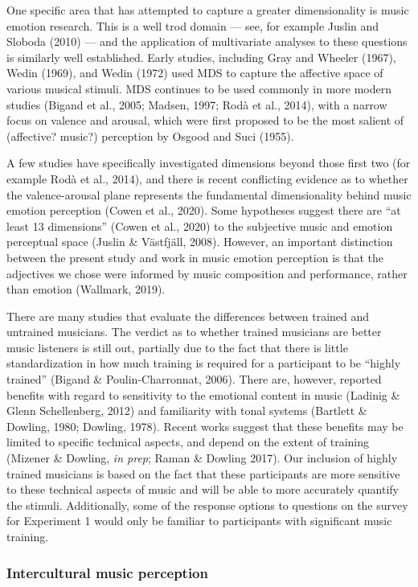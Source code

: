 \documentclass[
  english,
  man,floatsintext]{apa6}
\begin{document}
One specific area that has attempted to capture a greater dimensionality is music emotion research. This is a well trod domain --- see, for example Juslin and Sloboda (2010) --- and the application of multivariate analyses to these questions is similarly well established. Early studies, including Gray and Wheeler (1967), Wedin (1969), and Wedin (1972) used MDS to capture the affective space of various musical stimuli. MDS continues to be used commonly in more modern studies (Bigand et al., 2005; Madsen, 1997; Rodà et al., 2014), with a narrow focus on valence and arousal, which were first proposed to be the most salient of (affective? music?) perception by Osgood and Suci (1955).

A few studies have specifically investigated dimensions beyond those first two (for example Rodà et al., 2014), and there is recent conflicting evidence as to whether the valence-arousal plane represents the fundamental dimensionality behind music emotion perception (Cowen et al., 2020). Some hypotheses suggest there are ``at least 13 dimensions'' (Cowen et al., 2020) to the subjective music and emotion perceptual space (Juslin \& Västfjäll, 2008). However, an important distinction between the present study and work in music emotion perception is that the adjectives we chose were informed by music composition and performance, rather than emotion (Wallmark, 2019).

There are many studies that evaluate the differences between trained and untrained musicians. The verdict as to whether trained musicians are better music listeners is still out, partially due to the fact that there is little standardization in how much training is required for a participant to be ``highly trained'' (Bigand \& Poulin-Charronnat, 2006). There are, however, reported benefits with regard to sensitivity to the emotional content in music (Ladinig \& Glenn Schellenberg, 2012) and familiarity with tonal systems (Bartlett \& Dowling, 1980; Dowling, 1978). Recent works suggest that these benefits may be limited to specific technical aspects, and depend on the extent of training (Mizener \& Dowling, \emph{in prep}; Raman \& Dowling 2017). Our inclusion of highly trained musicians is based on the fact that these participants are more sensitive to these technical aspects of music and will be able to more accurately quantify the stimuli. Additionally, some of the response options to questions on the survey for Experiment 1 would only be familiar to participants with significant music training.

\hypertarget{intercultural-music-perception}{%
\subsubsection{Intercultural music perception}\label{intercultural-music-perception}}
\end{document}
